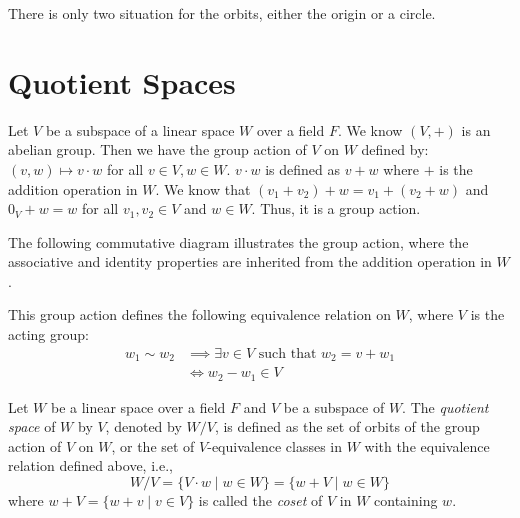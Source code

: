 \documentclass[
	11pt, %
	fleqn, %
	a4paper, %
]{LegrandOrangeBook}
\newcommand{\quotient}[2]{#1\! / #2} %
\begin{document}
\begin{remark}
    There is only two situation for the orbits, either the origin or a circle.
\end{remark}

\newpage

\section{Quotient Spaces}

Let $V$ be a subspace of a linear space $W$ over a field $F$. We know $(V, +)$ is an abelian group. Then we have the group action of $V$ on $W$ defined by: $(v, w) \mapsto v \cdot w$ for all $v \in V, w \in W$. $v \cdot w$ is defined as $v + w$ where $+$ is the addition operation in $W$.
We know that $(v_1 + v_2) + w = v_1 + (v_2 + w)$ and $0_V + w = w$ for all $v_1, v_2 \in V$ and $w \in W$. Thus, it is a group action. 

The following commutative diagram illustrates the group action, where the associative and identity properties are inherited from the addition operation in $W$.

\begin{center}
\end{center}

This group action defines the following equivalence relation on $W$, where $V$ is the acting group:
\[
    \begin{split}
        w_1 \sim w_2 & \implies \exists v \in V \text{ such that } w_2 = v + w_1 \\
        & \iff w_2 - w_1 \in V
    \end{split}
\]

\begin{definition}
    Let $W$ be a linear space over a field $F$ and $V$ be a subspace of $W$. The \emph{quotient space} of $W$ by $V$, denoted by $\quotient{W}{V}$, is defined as the set of orbits of the group action of $V$ on $W$, or the set of $V$-equivalence classes in $W$ with the equivalence relation defined above, i.e.,
    \[
        \quotient{W}{V} = \{ V \cdot w \mid w \in W \} = \{ w + V \mid w \in W \}
    \]
    where $w + V = \{ w + v \mid v \in V \}$ is called the \emph{coset} of $V$ in $W$ containing $w$.
\end{definition}
\end{document}
